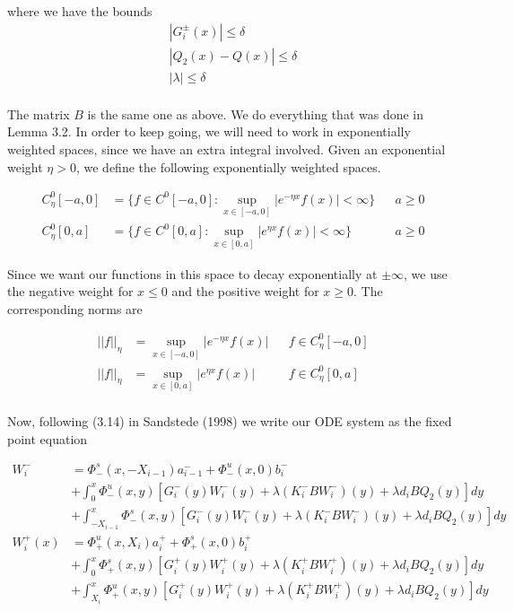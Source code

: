 \documentclass[12pt]{article}
\begin{document}
where we have the bounds
\begin{align*}
|G_i^\pm(x)| \leq \delta \\
|Q_2(x) - Q(x) | \leq \delta \\
|\lambda| \leq \delta \\
\end{align*}

The matrix $B$ is the same one as above. We do everything that was done in Lemma 3.2. In order to keep going, we will need to work in exponentially weighted spaces, since we have an extra integral involved. Given an exponential weight $\eta > 0$, we define the following exponentially weighted spaces.

\begin{align*}
C^0_\eta[-a, 0] &= \{ f \in C^0[-a, 0] : \sup_{x \in [-a, 0]} |e^{-\eta x} f(x) | < \infty \} && a \geq 0 \\
C^0_\eta[0, a] &= \{ f \in C^0[0, a] : \sup_{x \in [0, a]} |e^{\eta x} f(x) | < \infty \} && a \geq 0 
\end{align*}

Since we want our functions in this space to decay exponentially at $\pm \infty$, we use the negative weight for $x \leq 0$ and the positive weight for $x \geq 0$. The corresponding norms are 

\begin{align*}
|| f ||_\eta &= \sup_{x \in [-a, 0]} |e^{-\eta x} f(x) | && f \in C^0_\eta[-a, 0] \\
|| f ||_\eta &= \sup_{x \in [0, a]} |e^{\eta x} f(x) | && f \in C^0_\eta[0, a] \\
\end{align*}

Now, following (3.14) in Sandstede (1998) we write our ODE system as the fixed point equation

\begin{align*}
W_i^- &= \Phi^s_-(x, -X_{i-1})a^-_{i-1} + \Phi^u_-(x, 0)b_i^- \\
&+ \int_0^x \Phi^u_-(x, y)[G_i^-(y) W_i^-(y) + \lambda (K_i^- B W_i^-)(y) + \lambda d_i B Q_2(y) ] dy \\
&+ \int_{-X_{i-1}}^x \Phi^s_-(x, y)[G_i^-(y) W_i^-(y) + \lambda (K_i^-B W_i^-)(y) + \lambda d_i B Q_2(y) ] dy \\
W_i^+(x) &= \Phi^u_+(x, X_i)a^+_{i} + \Phi^s_+(x, 0)b_i^+ \\
&+ \int_0^x \Phi^s_+(x, y)[G_i^+(y) W_i^+(y) + \lambda (K_i^+ B W_i^+)(y) + \lambda d_i B Q_2(y) ] dy \\
&+ \int_{X_{i}}^x \Phi^u_+(x, y)[G_i^+(y) W_i^+(y) + \lambda (K_i^+ B W_i^+)(y) + \lambda d_i B Q_2(y) ] dy
\end{align*}
\end{document}
